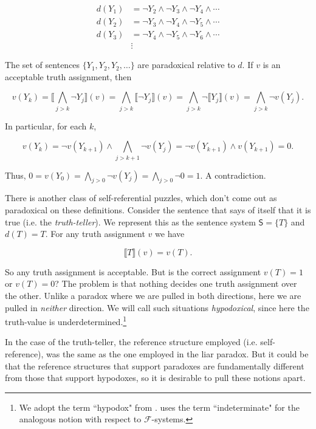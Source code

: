 \documentclass[12pt]{kluwer}
\theoremstyle{remark}
\newcommand{\prg}{\hspace{0.25in}}
\newcommand{\fancy}[1]{\mathcal{#1}}
\def\S{\textsf{S}}
\def\F{\fancy{F}}
\def\F{\fancy{F}}
\begin{document}
\begin{align*}
d(Y_1) &= \neg Y_2 \wedge \neg Y_3 \wedge \neg Y_4 \wedge \cdots \\
d(Y_2) &= \neg Y_3 \wedge \neg Y_4 \wedge \neg Y_5 \wedge \cdots \\
d(Y_3) &= \neg Y_4 \wedge \neg Y_5 \wedge \neg Y_6 \wedge \cdots \\
&\vdots
\end{align*}

The set of sentences $\{Y_1, Y_2, Y_2, \dots\}$ are paradoxical relative to $d$. If $v$ is an acceptable truth assignment, then
 
\[v(Y_k) = \llbracket \bigwedge_{j > k} \neg Y_j \rrbracket(v) = \bigwedge_{j > k} \llbracket \neg Y_j \rrbracket(v) = \bigwedge_{j > k} \neg \llbracket Y_j \rrbracket(v) = \bigwedge_{j > k} \neg v(Y_j).\]
 
In particular, for each $k$,
 
\[v(Y_k) = \neg v(Y_{k + 1}) \wedge \bigwedge_{j > k + 1} \neg v(Y_j) = \neg v(Y_{k + 1}) \wedge v(Y_{k + 1}) = 0.\]
 
Thus, $0 = v(Y_0) = \bigwedge_{j > 0} \neg v(Y_j)= \bigwedge_{j > 0} \neg 0 = 1$.  A contradiction. 

\prg There is another class of self-referential puzzles, which don't come out as paradoxical on these definitions. Consider the sentence that says of itself that it is true (i.e. the \textit{truth-teller}). We represent this as the sentence system $\S = \{T\}$ and $d(T) = T$. For any truth assignment $v$ we have
 
\[ \llbracket T \rrbracket(v) = v(T).\]

So any truth assignment is acceptable. But is the correct assignment $v(T) = 1$ or $v(T) =0$? The problem is that nothing decides one truth assignment over the other. Unlike a paradox where we are pulled in both directions, here we are pulled in \textit{neither} direction. We will call such situations \textit{hypodoxical}, since here the truth-value is underdetermined.\footnote{We adopt the term ``hypodox" from \cite{eldridge2008}.  \cite{cook} uses the term ``indeterminate" for the analogous notion with respect to $\F$-systems.} 

\prg In the case of the truth-teller, the reference structure employed (i.e. self-reference), was the same as the one employed in the liar paradox. But it could be that the reference structures that support paradoxes are fundamentally different from those that support hypodoxes, so it is desirable to pull these notions apart. 
\end{document}
